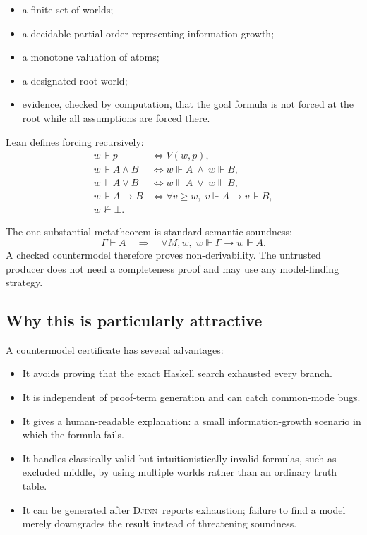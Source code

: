 \documentclass[11pt,letterpaper,openany]{report}
\theoremstyle{definition}
\theoremstyle{remark}
\newcommand{\Djinn}{\textsc{Djinn}}
\begin{document}
\begin{itemize}
\item a finite set of worlds;
\item a decidable partial order representing information growth;
\item a monotone valuation of atoms;
\item a designated root world;
\item evidence, checked by computation, that the goal formula is not forced at the root while all assumptions are forced there.
\end{itemize}

Lean defines forcing recursively:
\[
\begin{aligned}
 w\Vdash p &\iff V(w,p),\\
 w\Vdash A\land B &\iff w\Vdash A\ \wedge\ w\Vdash B,\\
 w\Vdash A\lor B &\iff w\Vdash A\ \vee\ w\Vdash B,\\
 w\Vdash A\to B &\iff \forall v\ge w,\; v\Vdash A\to v\Vdash B,\\
 w\not\Vdash\bot.&
\end{aligned}
\]

The one substantial metatheorem is standard semantic soundness:
\[
  \Gamma\vdash A
  \quad\Longrightarrow\quad
  \forall M,w,\; w\Vdash\Gamma \to w\Vdash A.
\]
A checked countermodel therefore proves non-derivability. The untrusted producer does not need a completeness proof and may use any model-finding strategy.

\subsection{Why this is particularly attractive}

A countermodel certificate has several advantages:

\begin{itemize}
\item It avoids proving that the exact Haskell search exhausted every branch.
\item It is independent of proof-term generation and can catch common-mode bugs.
\item It gives a human-readable explanation: a small information-growth scenario in which the formula fails.
\item It handles classically valid but intuitionistically invalid formulas, such as excluded middle, by using multiple worlds rather than an ordinary truth table.
\item It can be generated after \Djinn\ reports exhaustion; failure to find a model merely downgrades the result instead of threatening soundness.
\end{itemize}
\end{document}
